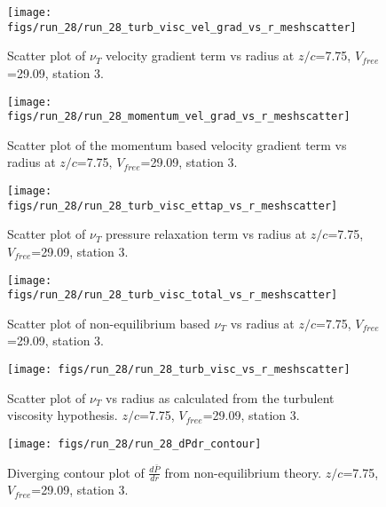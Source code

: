 \begin{figure}[H]
\centering
\texttt{[image: figs/run\_28/run\_28\_turb\_visc\_vel\_grad\_vs\_r\_meshscatter]}
\caption{Scatter plot of $\nu_T$ velocity gradient term vs radius at $z/c$=7.75, $V_{free}$=29.09, station 3.}
\end{figure}


\begin{figure}[H]
\centering
\texttt{[image: figs/run\_28/run\_28\_momentum\_vel\_grad\_vs\_r\_meshscatter]}
\caption{Scatter plot of the momentum based velocity gradient term vs radius at $z/c$=7.75, $V_{free}$=29.09, station 3.}
\end{figure}


\begin{figure}[H]
\centering
\texttt{[image: figs/run\_28/run\_28\_turb\_visc\_ettap\_vs\_r\_meshscatter]}
\caption{Scatter plot of $\nu_T$ pressure relaxation term vs radius at $z/c$=7.75, $V_{free}$=29.09, station 3.}
\end{figure}


\begin{figure}[H]
\centering
\texttt{[image: figs/run\_28/run\_28\_turb\_visc\_total\_vs\_r\_meshscatter]}
\caption{Scatter plot of non-equilibrium based $\nu_T$ vs radius at $z/c$=7.75, $V_{free}$=29.09, station 3.}
\end{figure}


\begin{figure}[H]
\centering
\texttt{[image: figs/run\_28/run\_28\_turb\_visc\_vs\_r\_meshscatter]}
\caption{Scatter plot of $\nu_T$ vs radius as calculated from the turbulent viscosity hypothesis. $z/c$=7.75, $V_{free}$=29.09, station 3.}
\end{figure}


\begin{figure}[H]
\centering
\texttt{[image: figs/run\_28/run\_28\_dPdr\_contour]}
\caption{Diverging contour plot of $\frac{d\bar{P}}{dr}$ from non-equilibrium theory. $z/c$=7.75, $V_{free}$=29.09, station 3.}
\end{figure}


